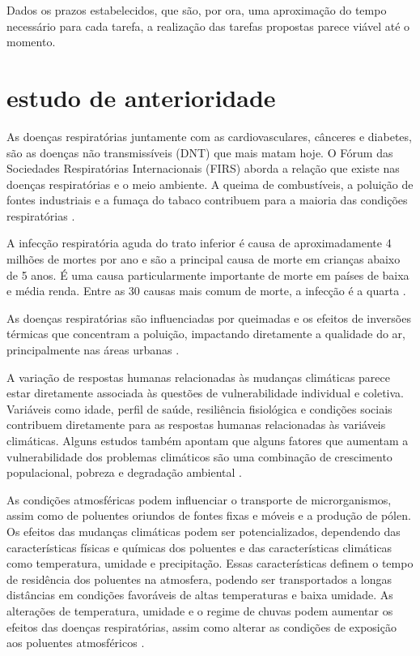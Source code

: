 \documentclass[journal]{IEEEtran}
\begin{document}
Dados os prazos estabelecidos, que são, por ora, uma aproximação  do tempo necessário para cada tarefa, a realização das tarefas propostas parece viável até o momento.


\section{estudo de anterioridade} 
As doenças respiratórias juntamente com as cardiovasculares, cânceres e diabetes, são as doenças não transmissíveis (DNT) que mais matam hoje.
O Fórum das Sociedades Respiratórias Internacionais (FIRS) aborda a relação que existe nas doenças respiratórias e o meio ambiente. A queima de combustíveis, a poluição de fontes industriais e a fumaça do tabaco contribuem para a maioria das condições respiratórias \cite{firs}.

A infecção respiratória aguda do trato inferior é causa de aproximadamente 4 milhões de mortes por ano e são a principal causa de morte em crianças abaixo de 5 anos. É uma causa particularmente importante de morte em países de baixa e média renda. Entre as 30 causas mais comum de morte, a infecção é a quarta \cite{firs}.

As  doenças  respiratórias  são influenciadas por queimadas e os efeitos de inversões térmicas que concentram a poluição, impactando diretamente a qualidade do ar, principalmente nas áreas urbanas \cite{mudanças}.

A variação de respostas humanas relacionadas às mudanças  climáticas  parece  estar  diretamente  associada às  questões  de  vulnerabilidade  individual  e  coletiva. Variáveis  como  idade,  perfil  de  saúde,  resiliência  fisiológica e condições sociais contribuem diretamente para  as  respostas  humanas  relacionadas  às  variáveis climáticas.  Alguns  estudos também  apontam  que  alguns  fatores  que  aumentam a  vulnerabilidade  dos  problemas  climáticos  são  uma combinação  de  crescimento  populacional,  pobreza  e degradação  ambiental \cite{mudanças}.

As  condições  atmosféricas  podem  influenciar  o  transporte  de  microrganismos,  assim  como  de  poluentes oriundos de fontes fixas e móveis e a produção de pólen. Os efeitos das mudanças climáticas podem ser potencializados, dependendo das características físicas e químicas dos poluentes e das características climáticas como temperatura, umidade e precipitação. Essas características definem o tempo de residência dos poluentes na atmosfera, podendo ser transportados a  longas  distâncias  em  condições  favoráveis  de  altas temperaturas  e  baixa  umidade.  As alterações de temperatura, umidade e o regime de chuvas podem aumentar os efeitos das doenças respiratórias, assim como alterar as condições de exposição aos poluentes atmosféricos  \cite{mudanças}.
\end{document}
